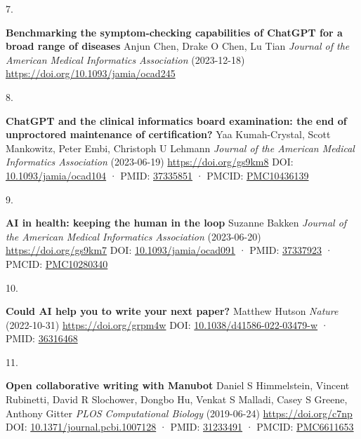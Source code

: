 \documentclass[
]{article}
\newlength{\cslhangindent}
\newlength{\csllabelwidth}
\newlength{\cslentryspacingunit} %
\newenvironment{CSLReferences}[2] %
 {%
  \setlength{\parindent}{0pt}
  \ifodd #1
  \let\oldpar\par
  \def\par{\hangindent=\cslhangindent\oldpar}
  \fi
  \setlength{\parskip}{#2\cslentryspacingunit}
 }%
 {}
\newcommand{\CSLBlock}[1]{#1\hfill\break}
\newcommand{\CSLLeftMargin}[1]{\parbox[t]{\csllabelwidth}{#1}}
\newcommand{\CSLRightInline}[1]{\parbox[t]{\linewidth - \csllabelwidth}{#1}\break}
\begin{document}
\begin{CSLReferences}{0}{0}
\leavevmode{}%
\CSLLeftMargin{7. }%
\CSLRightInline{\textbf{Benchmarking the symptom-checking capabilities of ChatGPT for a broad range of diseases}
\CSLBlock{Anjun Chen, Drake O Chen, Lu Tian} \emph{Journal of the American Medical Informatics Association} (2023-12-18) \url{https://doi.org/10.1093/jamia/ocad245}}

\leavevmode{}%
\CSLLeftMargin{8. }%
\CSLRightInline{\textbf{ChatGPT and the clinical informatics board examination: the end of unproctored maintenance of certification?}
\CSLBlock{Yaa Kumah-Crystal, Scott Mankowitz, Peter Embi, Christoph U Lehmann} \emph{Journal of the American Medical Informatics Association} (2023-06-19) \url{https://doi.org/gs9km8}
\CSLBlock{DOI: \href{https://doi.org/10.1093/jamia/ocad104}{10.1093/jamia/ocad104} · PMID: \href{https://www.ncbi.nlm.nih.gov/pubmed/37335851}{37335851} · PMCID: \href{https://www.ncbi.nlm.nih.gov/pmc/articles/PMC10436139}{PMC10436139}}}

\leavevmode{}%
\CSLLeftMargin{9. }%
\CSLRightInline{\textbf{AI in health: keeping the human in the loop}
\CSLBlock{Suzanne Bakken} \emph{Journal of the American Medical Informatics Association} (2023-06-20) \url{https://doi.org/gs9km7}
\CSLBlock{DOI: \href{https://doi.org/10.1093/jamia/ocad091}{10.1093/jamia/ocad091} · PMID: \href{https://www.ncbi.nlm.nih.gov/pubmed/37337923}{37337923} · PMCID: \href{https://www.ncbi.nlm.nih.gov/pmc/articles/PMC10280340}{PMC10280340}}}

\leavevmode{}%
\CSLLeftMargin{10. }%
\CSLRightInline{\textbf{Could AI help you to write your next paper?}
\CSLBlock{Matthew Hutson} \emph{Nature} (2022-10-31) \url{https://doi.org/grpm4w}
\CSLBlock{DOI: \href{https://doi.org/10.1038/d41586-022-03479-w}{10.1038/d41586-022-03479-w} · PMID: \href{https://www.ncbi.nlm.nih.gov/pubmed/36316468}{36316468}}}

\leavevmode{}%
\CSLLeftMargin{11. }%
\CSLRightInline{\textbf{Open collaborative writing with Manubot}
\CSLBlock{Daniel S Himmelstein, Vincent Rubinetti, David R Slochower, Dongbo Hu, Venkat S Malladi, Casey S Greene, Anthony Gitter} \emph{PLOS Computational Biology} (2019-06-24) \url{https://doi.org/c7np}
\CSLBlock{DOI: \href{https://doi.org/10.1371/journal.pcbi.1007128}{10.1371/journal.pcbi.1007128} · PMID: \href{https://www.ncbi.nlm.nih.gov/pubmed/31233491}{31233491} · PMCID: \href{https://www.ncbi.nlm.nih.gov/pmc/articles/PMC6611653}{PMC6611653}}}


\end{CSLReferences}
\end{document}
